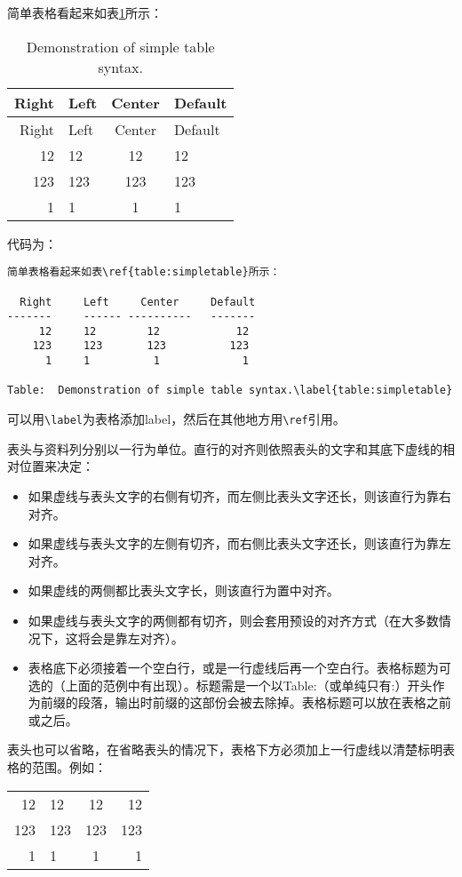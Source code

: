 \documentclass[fancyhdr,bookmark]{ctexbook}
\begin{document}
简单表格看起来如表\ref{table:simpletable}所示：

\begin{longtable}[c]{@{}rlcl@{}}
\caption{Demonstration of simple table
syntax.\label{table:simpletable}}\tabularnewline
\toprule
Right & Left & Center & Default\tabularnewline
\midrule
\endfirsthead
\toprule
Right & Left & Center & Default\tabularnewline
\midrule
\endhead
12 & 12 & 12 & 12\tabularnewline
123 & 123 & 123 & 123\tabularnewline
1 & 1 & 1 & 1\tabularnewline
\bottomrule
\end{longtable}

代码为：

\begin{lstlisting}
简单表格看起来如表\ref{table:simpletable}所示：

  Right     Left     Center     Default
-------     ------ ----------   -------
     12     12        12            12
    123     123       123          123
      1     1          1             1

Table:  Demonstration of simple table syntax.\label{table:simpletable}
\end{lstlisting}

可以用\lstinline!\label!为表格添加label，然后在其他地方用\lstinline!\ref!引用。

表头与资料列分别以一行为单位。直行的对齐则依照表头的文字和其底下虚线的相对位置来决定：

\begin{itemize}
\itemsep1pt\parskip0pt
\item
  如果虚线与表头文字的右侧有切齐，而左侧比表头文字还长，则该直行为靠右对齐。
\item
  如果虚线与表头文字的左侧有切齐，而右侧比表头文字还长，则该直行为靠左对齐。
\item
  如果虚线的两侧都比表头文字长，则该直行为置中对齐。
\item
  如果虚线与表头文字的两侧都有切齐，则会套用预设的对齐方式（在大多数情况下，这将会是靠左对齐）。
\item
  表格底下必须接着一个空白行，或是一行虚线后再一个空白行。表格标题为可选的（上面的范例中有出现）。标题需是一个以Table:（或单纯只有:）开头作为前缀的段落，输出时前缀的这部份会被去除掉。表格标题可以放在表格之前或之后。
\end{itemize}

表头也可以省略，在省略表头的情况下，表格下方必须加上一行虚线以清楚标明表格的范围。例如：

\begin{longtable}[c]{@{}rlcr@{}}
\toprule
12 & 12 & 12 & 12\tabularnewline
123 & 123 & 123 & 123\tabularnewline
1 & 1 & 1 & 1\tabularnewline
\bottomrule
\end{longtable}
\end{document}
